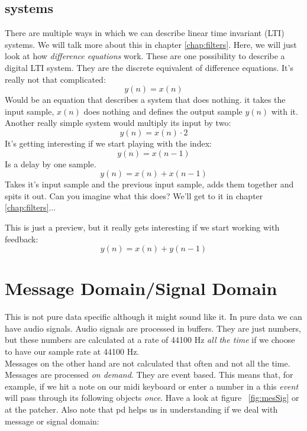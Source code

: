 \subsection{systems}

There are multiple ways in which we can describe linear time invariant (LTI) systems. We will talk more about this in chapter \ref{chap:filters}. Here, we will just look at how \textit{difference equations} work. These are one possibility to describe a digital LTI system. They are the discrete equivalent of difference equations. It's really not that complicated:
\begin{equation}
	y(n) = x(n)
\end{equation}
Would be an equation that describes a system that does nothing. it takes the input sample, $x(n)$ does nothing and defines the output sample $y(n)$ with it.
Another really simple system would multiply its input by two:
\begin{equation}
	y(n) = x(n)\cdot 2
\end{equation}
It's getting interesting if we start playing with the index:
\begin{equation}
	y(n) = x(n-1)
\end{equation}
Is a delay by one sample.
\begin{equation}
	y(n) = x(n)+x(n-1)
\end{equation}
Takes it's input sample and the previous input sample, adds them together and spits it out. Can you imagine what this does? We'll get to it in chapter \ref{chap:filters}...

This is just a preview, but it really gets interesting if we start working with feedback:
\begin{equation}
 	y(n) = x(n)+y(n-1)
 \end{equation} 


\section{Message Domain/Signal Domain}
This is not pure data specific although it might sound like it.
In pure data we can have audio signals. Audio signals are processed in buffers. They are just numbers, but these numbers are calculated at a rate of 44100 Hz \textit{all the time} if we choose to have our sample rate at 44100 Hz.\\
Messages on the other hand are not calculated that often and not all the time. Messages are processed \textit{on demand}. They are event based. This means that, for example, if we hit a note on our midi keyboard or enter a number in a  this \textit{event} will pass through its following objects \textit{once}. Have a look at figure ~\ref{fig:mesSig} or at the patcher. Also note that pd helps us in understanding if we deal with message or signal domain:

